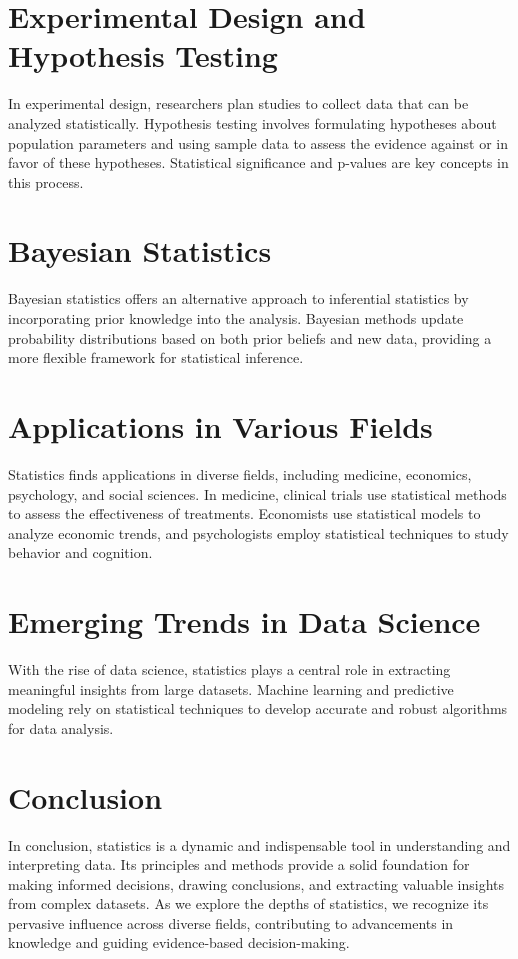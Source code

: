 \documentclass{article}
\begin{document}
\section*{Experimental Design and Hypothesis Testing}
In experimental design, researchers plan studies to collect data that can be analyzed statistically. Hypothesis testing involves formulating hypotheses about population parameters and using sample data to assess the evidence against or in favor of these hypotheses. Statistical significance and p-values are key concepts in this process.

\section*{Bayesian Statistics}
Bayesian statistics offers an alternative approach to inferential statistics by incorporating prior knowledge into the analysis. Bayesian methods update probability distributions based on both prior beliefs and new data, providing a more flexible framework for statistical inference.

\section*{Applications in Various Fields}
Statistics finds applications in diverse fields, including medicine, economics, psychology, and social sciences. In medicine, clinical trials use statistical methods to assess the effectiveness of treatments. Economists use statistical models to analyze economic trends, and psychologists employ statistical techniques to study behavior and cognition.

\section*{Emerging Trends in Data Science}
With the rise of data science, statistics plays a central role in extracting meaningful insights from large datasets. Machine learning and predictive modeling rely on statistical techniques to develop accurate and robust algorithms for data analysis.

\section*{Conclusion}
In conclusion, statistics is a dynamic and indispensable tool in understanding and interpreting data. Its principles and methods provide a solid foundation for making informed decisions, drawing conclusions, and extracting valuable insights from complex datasets. As we explore the depths of statistics, we recognize its pervasive influence across diverse fields, contributing to advancements in knowledge and guiding evidence-based decision-making.
\end{document}
